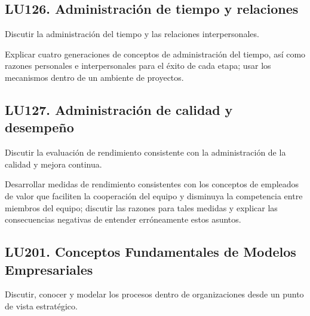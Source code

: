 \subsection{LU126. Administración de tiempo y relaciones}\label{sec:LU126}
\begin{LearningUnit}
\begin{LUGoal}
\item Discutir la administración del tiempo y las relaciones interpersonales.
\end{LUGoal}

\begin{LUObjective}
\item Explicar cuatro generaciones de conceptos de administración del tiempo, así como razones personales e interpersonales para el éxito de cada etapa; usar los mecanismos dentro de un ambiente de proyectos.
\end{LUObjective}
\end{LearningUnit}

\subsection{LU127. Administración de calidad y desempeño}\label{sec:LU127}
\begin{LearningUnit}
\begin{LUGoal}
\item Discutir la evaluación de rendimiento consistente con la administración de la calidad y mejora continua.
\end{LUGoal}

\begin{LUObjective}
\item Desarrollar medidas de rendimiento consistentes con los conceptos de empleados de valor que faciliten la cooperación del equipo y disminuya la competencia entre miembros del equipo; discutir las razones para tales medidas y explicar las consecuencias negativas de entender erróneamente estos asuntos.
\end{LUObjective}
\end{LearningUnit}

\subsection{LU201. Conceptos Fundamentales de Modelos Empresariales}\label{sec:LU201}
\begin{LearningUnit}
\begin{LUGoal}
\item Discutir, conocer y modelar los procesos dentro de organizaciones desde un punto de vista estratégico.
\end{LUGoal}

\end{LearningUnit}

